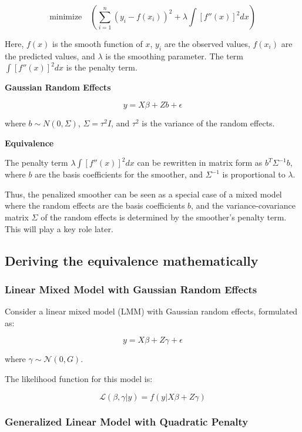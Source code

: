\documentclass[12pt, twoside,hidelinks]{article}
\theoremstyle{definition}
\numberwithin{equation}{section}
\begin{document}
\[
\text{minimize} \quad \left( \sum_{i=1}^{n} (y_i - f(x_i))^2 + \lambda \int [f''(x)]^2 dx \right)
\]

Here, \( f(x) \) is the smooth function of \( x \), \( y_i \) are the observed values, \( f(x_i) \) are the predicted values, and \( \lambda \) is the smoothing parameter. The term \( \int [f''(x)]^2 dx \) is the penalty term.
\newline

\textbf{Gaussian Random Effects}

\[
y = X\beta + Zb + \epsilon
\]

where \( b \sim N(0, \Sigma) \), \( \Sigma = \tau^2 I \), and \( \tau^2 \) is the variance of the random effects.
\newline

\textbf{Equivalence}
\newline

The penalty term \( \lambda \int [f''(x)]^2 dx \) can be rewritten in matrix form as \( b^T \Sigma^{-1} b \), where \( b \) are the basis coefficients for the smoother, and \( \Sigma^{-1} \) is proportional to \( \lambda \).
\newline

Thus, the penalized smoother can be seen as a special case of a mixed model where the random effects are the basis coefficients \( b \), and the variance-covariance matrix \( \Sigma \) of the random effects is determined by the smoother's penalty term. This will play a key role later.

\subsection{Deriving the equivalence mathematically}

\subsubsection{Linear Mixed Model with Gaussian Random Effects}

Consider a linear mixed model (LMM) with Gaussian random effects, formulated as:

\[
y = X\beta + Z\gamma + \epsilon
\]

where \( \gamma \sim \mathcal{N}(0, G) \).

The likelihood function for this model is:

\[
\mathcal{L}(\beta, \gamma | y) = f(y | X\beta + Z\gamma)
\]

\subsubsection{Generalized Linear Model with Quadratic Penalty}
\end{document}
